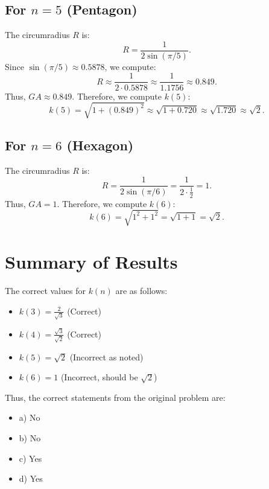 \documentclass{article}
\begin{document}
\subsection*{For \( n = 5 \) (Pentagon)}
The circumradius \( R \) is:
\[
R = \frac{1}{2 \sin(\pi/5)}.
\]
Since \( \sin(\pi/5) \approx 0.5878 \), we compute:
\[
R \approx \frac{1}{2 \cdot 0.5878} \approx \frac{1}{1.1756} \approx 0.849.
\]
Thus, \( GA \approx 0.849 \). Therefore, we compute \( k(5) \):
\[
k(5) = \sqrt{1 + (0.849)^2} \approx \sqrt{1 + 0.720} \approx \sqrt{1.720} \approx \sqrt{2}.
\]

\subsection*{For \( n = 6 \) (Hexagon)}
The circumradius \( R \) is:
\[
R = \frac{1}{2 \sin(\pi/6)} = \frac{1}{2 \cdot \frac{1}{2}} = 1.
\]
Thus, \( GA = 1 \). Therefore, we compute \( k(6) \):
\[
k(6) = \sqrt{1^2 + 1^2} = \sqrt{1 + 1} = \sqrt{2}.
\]

\section*{Summary of Results}

The correct values for \( k(n) \) are as follows:
\begin{itemize}
    \item \( k(3) = \frac{2}{\sqrt{3}} \) (Correct)
    \item \( k(4) = \frac{\sqrt{3}}{\sqrt{2}} \) (Correct)
    \item \( k(5) = \sqrt{2} \) (Incorrect as noted)
    \item \( k(6) = 1 \) (Incorrect, should be \( \sqrt{2} \))
\end{itemize}

Thus, the correct statements from the original problem are:
\begin{itemize}
    \item a) No
    \item b) No
    \item c) Yes
    \item d) Yes
\end{itemize}
\end{document}
